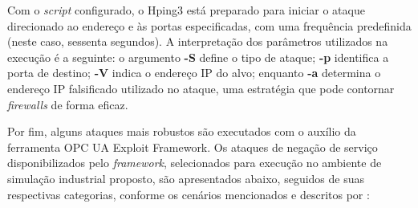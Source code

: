        Com o \textit{script} configurado, o Hping3 está preparado para iniciar o ataque direcionado ao endereço e às portas especificadas, com uma frequência predefinida (neste caso, sessenta segundos). A interpretação dos parâmetros utilizados na execução é a seguinte: o argumento \textbf{-S} define o tipo de ataque; \textbf{-p} identifica a porta de destino; \textbf{-V} indica o endereço IP do alvo; enquanto \textbf{-a} determina o endereço IP falsificado utilizado no ataque, uma estratégia que pode contornar \textit{firewalls} de forma eficaz.

        Por fim, alguns ataques mais robustos são executados com o auxílio da ferramenta OPC UA Exploit Framework. Os ataques de negação de serviço disponibilizados pelo \textit{framework}, selecionados para execução no ambiente de simulação industrial proposto, são apresentados abaixo, seguidos de suas respectivas categorias, conforme os cenários mencionados e descritos por :


